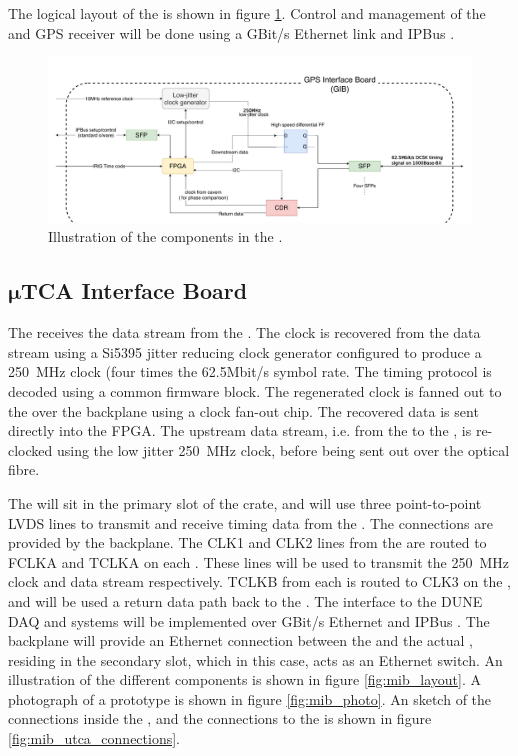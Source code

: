 \documentclass{dune}
\begin{document}
The logical layout of the  is shown in figure \ref{fig:gib_layout}. Control and management of the  and GPS receiver will be done using a GBit/s Ethernet link and IPBus \cite{ipbus}.

\begin{figure}[h]
\includegraphics[width=\textwidth]{gib_block_diagram.pdf}
\caption{Illustration of the components in the .}
\label{fig:gib_layout}
\end{figure}

\subsection[uTCA Interface Board]{$\boldsymbol{\mu}$TCA Interface Board}
The  receives the  data stream from the . The clock is recovered from the  data stream using a Si5395 jitter reducing clock generator configured to produce a \SI{250}{\MHz} clock (four times the 62.5Mbit/s symbol rate. The timing protocol is decoded using a common firmware block. The regenerated clock is fanned out to the  over the  backplane using a clock fan-out chip. The recovered data is sent directly into the  FPGA. The upstream data stream, i.e. from the  to the , is re-clocked using the low jitter \SI{250}{\MHz} clock, before being sent out over the optical fibre.

The  will sit in the primary  slot of the  crate, and will use three point-to-point LVDS lines to transmit and receive timing data from the . The connections are provided by the  backplane. The CLK1 and CLK2 lines from the  are routed to FCLKA and TCLKA on each . These lines will be used to transmit the \SI{250}{\MHz} clock and  data stream respectively. TCLKB from each  is routed to CLK3 on the , and will be used a return data path back to the . The interface to the DUNE DAQ and  systems will be implemented over GBit/s Ethernet and IPBus \cite{ipbus}. The  backplane will provide an Ethernet connection between the  and the actual , residing in the secondary  slot, which in this case, acts as an Ethernet switch. An illustration of the different  components is shown in figure \ref{fig:mib_layout}. A photograph of a prototype  is shown in figure \ref{fig:mib_photo}. An sketch of the connections inside the , and the connections to the  is shown in figure \ref{fig:mib_utca_connections}.
\end{document}
